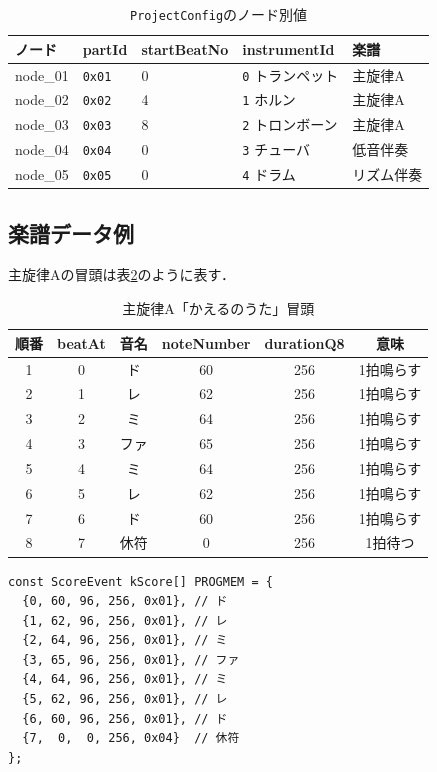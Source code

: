 \documentclass[uplatex,dvipdfmx]{jlreq}
\newcommand{\code}[1]{\texttt{#1}}
\begin{document}
\begin{table}[H]
\centering
\caption{\code{ProjectConfig}のノード別値}
\label{tab:saito-config-values}
\begin{tabular}{p{}p{}p{}p{}p{}}
\toprule
\textbf{ノード} & \textbf{partId} & \textbf{startBeatNo} & \textbf{instrumentId} & \textbf{楽譜} \\
\midrule
node\_01 & \code{0x01} & 0 & \code{0} トランペット & 主旋律A \\
node\_02 & \code{0x02} & 4 & \code{1} ホルン & 主旋律A \\
node\_03 & \code{0x03} & 8 & \code{2} トロンボーン & 主旋律A \\
node\_04 & \code{0x04} & 0 & \code{3} チューバ & 低音伴奏 \\
node\_05 & \code{0x05} & 0 & \code{4} ドラム & リズム伴奏 \\
\bottomrule
\end{tabular}
\end{table}

\subsection{楽譜データ例}

主旋律Aの冒頭は表\ref{tab:saito-melody}のように表す．

\begin{table}[H]
\centering
\caption{主旋律A「かえるのうた」冒頭}
\label{tab:saito-melody}
\begin{tabular}{cccccc}
\toprule
\textbf{順番} & \textbf{beatAt} & \textbf{音名} & \textbf{noteNumber} & \textbf{durationQ8} & \textbf{意味} \\
\midrule
1 & 0 & ド & 60 & 256 & 1拍鳴らす \\
2 & 1 & レ & 62 & 256 & 1拍鳴らす \\
3 & 2 & ミ & 64 & 256 & 1拍鳴らす \\
4 & 3 & ファ & 65 & 256 & 1拍鳴らす \\
5 & 4 & ミ & 64 & 256 & 1拍鳴らす \\
6 & 5 & レ & 62 & 256 & 1拍鳴らす \\
7 & 6 & ド & 60 & 256 & 1拍鳴らす \\
8 & 7 & 休符 & 0 & 256 & 1拍待つ \\
\bottomrule
\end{tabular}
\end{table}

\begin{verbatim}
const ScoreEvent kScore[] PROGMEM = {
  {0, 60, 96, 256, 0x01}, // ド
  {1, 62, 96, 256, 0x01}, // レ
  {2, 64, 96, 256, 0x01}, // ミ
  {3, 65, 96, 256, 0x01}, // ファ
  {4, 64, 96, 256, 0x01}, // ミ
  {5, 62, 96, 256, 0x01}, // レ
  {6, 60, 96, 256, 0x01}, // ド
  {7,  0,  0, 256, 0x04}  // 休符
};
\end{verbatim}
\end{document}
